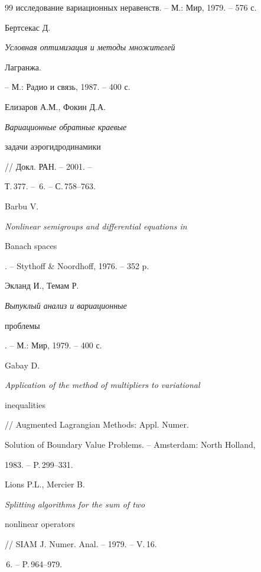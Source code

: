\begin{thebibliography}{99}
{исследование вариационных неравенств}. -- М.: Мир, 1979. -- 576 с.





 Бертсекас Д. {\it Условная оптимизация и методы множителей


Лагранжа.} -- М.: Радио и связь, 1987. -- 400 с.





 Елизаров А.М., Фокин Д.А. {\it Вариационные обратные краевые


задачи аэрогидродинамики} // Докл. РАН. -- 2001. --


Т.\,377. -- \No\,6. -- С.\,758--763.





 Barbu V. {\it Nonlinear semigroups and differential equations in


Banach spaces}. -- Stythoff \& Noordhoff, 1976. -- 352 p.





 Экланд И., Темам Р. {\it Выпуклый анализ и вариационные


проблемы}. -- М.: Мир, 1979. -- 400 с.







Gabay D. {\it Application of the method of multipliers to variational


inequalities} // Augmented Lagrangian Methods: Appl. Numer.


Solution of Boundary Value Problems. -- Amsterdam: North Holland,


1983. -- P.\,299--331.







Lions P.L., Mercier B. {\it Splitting algorithms for the sum of two


nonlinear operators} // SIAM J. Numer. Anal. -- 1979. -- V.\,16.


\No\,6. -- P.\,964--979.





\end{thebibliography}





\vskip 2cm












\label{end}











